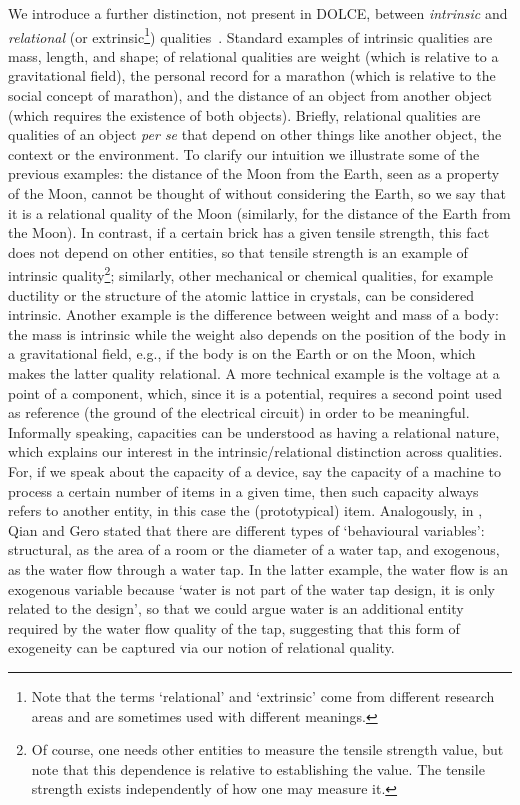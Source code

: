 \documentclass[sw]{iosart2x}
\newcommand{\DOLCE}{\textsc{DOLCE}\xspace} %
\newcommand{\firstTimeKeyWord}[1]{\textit{#1}}
\newcommand{\quotes}[1]{`#1'}
\begin{document}
We  introduce a further distinction, not present in \DOLCE, between \firstTimeKeyWord{intrinsic} and \firstTimeKeyWord{relational} (or extrinsic\footnote{
Note that the terms `relational' and `extrinsic' come from different research areas and are sometimes used with different meanings. 
}) qualities~\cite{sep-intrinsic-extrinsic}. 
Standard examples of intrinsic qualities are mass, length, and shape; of relational qualities are weight (which is relative to a gravitational field), the personal record for a marathon (which is relative to the social concept of marathon), and the distance of an object from another object (which requires the existence of both objects). 
Briefly, relational qualities are qualities of an object \textit{per se} that depend on other things like another object, the context or the environment.
To clarify our intuition we illustrate some of the previous examples: the distance of the Moon from the Earth, seen as a property of the Moon, cannot be thought of without considering the Earth, so we say that it is a relational quality of the Moon (similarly, for the distance of the Earth from the Moon). 
In contrast, if a certain brick has a given tensile strength, this fact does not depend on other entities, so that tensile strength is an example of intrinsic quality\footnote{Of course, one needs other entities to measure the tensile strength value, but note that this dependence is relative to establishing the value. The tensile strength exists independently of how one may measure it.}; similarly, other mechanical or chemical qualities, for example ductility or the structure of the atomic lattice in crystals, can be considered intrinsic. 
Another example is the difference between weight and mass of a body: the mass is intrinsic while the weight also depends on the position of the body in a gravitational field, e.g., if the body is on the Earth or on the Moon, which makes the latter quality relational. 
A more technical example is the voltage at a point of a component, which, since it is a potential, requires a second point used as  reference (the ground of the electrical circuit) in order to be meaningful. 
Informally speaking, capacities can be understood as having a relational nature, which explains our interest in the intrinsic/relational distinction across qualities. For, if we speak about the capacity of a device, say the capacity of a machine to process a certain number of items in a given time, then such capacity always refers to another entity, in this case the (prototypical) item.  Analogously, in \cite{qianFunctionBehaviorStructure1996}, Qian and Gero stated that there are different types of \quotes{behavioural variables}: structural, as the area of a room or the diameter of a water tap, and exogenous, as the water flow through a water tap. In the latter example, the water flow is an exogenous variable because \quotes{water is not part of the water tap design, it is only related to the design}, so that we could argue water is an additional entity required by the water flow quality of the tap, suggesting that this form of exogeneity can be captured via our notion of relational quality.  
\end{document}

